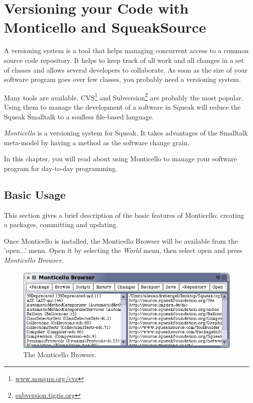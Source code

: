 \documentclass[a4paper,10pt,twoside]{book}
\begin{document}
	\renewcommand{\nnbb}[2]{} %
	\sloppy
\fi

\newcommand{\figlabel}[1]{\label{fig:#1}}
\newcommand{\seclabel}[1]{\label{sec:#1}}

\chapter{Versioning your Code with Monticello and SqueakSource}

A versioning system is a tool that helps managing concurrent access to a common source code repository. It helps to keep track of all work and all changes in a set of classes and allows several developers to collaborate. As soon as the size of your software program goes over few classes, you probably need a versioning system.

Many tools are available. CVS\footnote{\href{http://www.nongnu.org/cvs/}{www.nongnu.org/cvs}} and Subversion\footnote{\href{http://subversion.tigris.org/}{subversion.tigris.org}} are probably the most popular. Using them to manage the development of a software in Squeak will reduce the Squeak Smalltalk to a soulless file-based language. 

\emph{Monticello} is a versioning system for Squeak. It takes advantages of the Smalltalk meta-model by having a method as the software change grain. 

In this chapter, you will read about using Monticello to manage your software program for day-to-day programming.


\section{Basic Usage}

This section gives a brief description of the basic features of Monticello: creating a packages, committing and updating.

Once Monticello is installed, the Monticello Browser will be available from the 'open...' menu. Open it by selecting the \emph{World} menu, then select open and press \emph{Monticello Browser}.

\begin{figure}[ht]\centering
	\includegraphics[width=.75\linewidth]{monticello.png}
	\caption{The Monticello Browser.\figlabel{monticelloMain}}
\end{figure}
\end{document}
